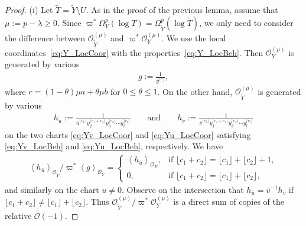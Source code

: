 \documentclass[pdftex]{sigma}
\newcommand{\sO}{\mathscr{O}}
\newcommand{\flr}[1]{\lfloor #1 \rfloor}
\newcommand{\gen}[1]{\left\langle #1 \right\rangle}
\begin{document}
\begin{proof}(i) Let $\widetilde{T} = \widetilde{Y}\setminus U$. As in the proof of the previous lemma, assume that $\mu:= p-\lambda \geq 0$. Since $\varpi^*\Omega_Y^p(\log T) = \Omega_{\widetilde{Y}}^p(\log \widetilde{T})$,
we only need to consider the difference between $\sO_{\widetilde{Y}}^{(\mu)}$ and $\varpi^*\sO_Y^{(\mu)}$. We use the local coordinates~\eqref{eq:Y_LocCoor} with the properties~\eqref{eq:Y_LocBeh}. Then $\sO_Y^{(\mu)}$ is generated by various
\begin{gather}\label{eq:g_Gen}g := \frac{1}{y^{\flr{c}}},\end{gather}
where $c = (1-\theta)\mu a + \theta\mu b$ for $0\leq\theta\leq 1$. On the other hand, $\sO_{\widetilde{Y}}^{(\mu)}$ is generated by various
\begin{gather*} h_{\bar{u}} := \frac{1}{\bar{u}^{\flr{c_1}}y_2^{\flr{c_1+c_2}}y_3^{\flr{c_3}}\cdots y_l^{\flr{c_l}}} \qquad\text{and}\qquad h_{\bar{v}} :=	\frac{1}{\bar{v}^{\flr{c_2}}y_1^{\flr{c_1+c_2}}y_3^{\flr{c_3}}
	\cdots y_l^{\flr{c_l}}} \end{gather*}
on the two charts \eqref{eq:Yv_LocCoor} and \eqref{eq:Yu_LocCoor} satisfying \eqref{eq:Yv_LocBeh} and \eqref{eq:Yu_LocBeh}, respectively. We have
\begin{gather*} \gen{h_{\bar{u}}}_{\sO_{\widetilde{Y}}}/\varpi^*\gen{g}_{\sO_Y} = \begin{cases}
\gen{h_{\bar{u}}}_{\sO_E}, & 	\text{if $\flr{c_1+c_2} = \flr{c_1} + \flr{c_2} + 1$}, \\
0, & \text{if $\flr{c_1+c_2} = \flr{c_1} + \flr{c_2}$},
\end{cases} \end{gather*}
and similarly on the chart $u\neq 0$. Observe on the intersection that $h_{\bar{u}} = \bar{v}^{-1}h_{\bar{v}}$ if $\flr{c_1+c_2} \neq \flr{c_1} + \flr{c_2}$. Thus $\sO_{\widetilde{Y}}^{(\mu)}/\varpi^*\sO_{Y}^{(\mu)}$
is a direct sum of copies of the relative $\sO(-1)$.


\end{proof}
\end{document}
